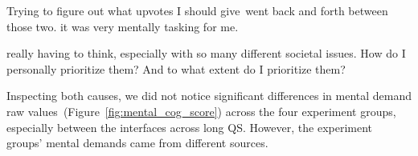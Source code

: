 \begin{displayquote}
Trying to figure out what upvotes I should give~\bracketellipsis went back and forth between those two. \bracketellipsis it was very mentally tasking for me. \hfill{}
\end{displayquote}

\begin{displayquote}
\bracketellipsis really having to think, especially with so many different societal issues. How do I personally prioritize them? And to what extent do I prioritize them? \hfill{}
\end{displayquote}

Inspecting both causes, we did not notice significant differences in mental demand raw values~(Figure~\ref{fig:mental_cog_score}) across the four experiment groups, especially between the interfaces across long QS. However, the experiment groups' mental demands came from different sources.






